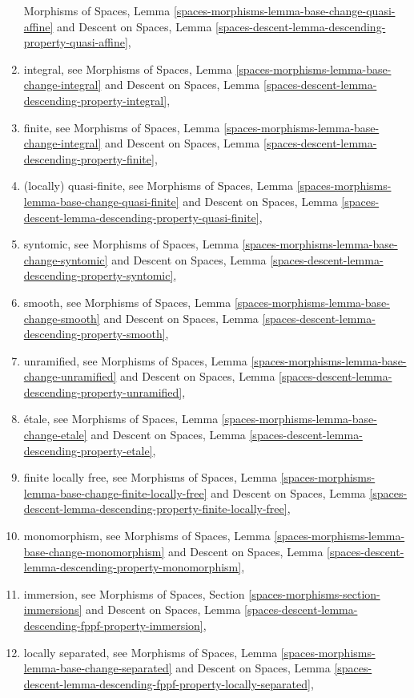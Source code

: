 \begin{enumerate}
Morphisms of Spaces,
Lemma \ref{spaces-morphisms-lemma-base-change-quasi-affine}
and
Descent on Spaces,
Lemma \ref{spaces-descent-lemma-descending-property-quasi-affine},
\item integral, see
Morphisms of Spaces,
Lemma \ref{spaces-morphisms-lemma-base-change-integral}
and
Descent on Spaces,
Lemma \ref{spaces-descent-lemma-descending-property-integral},
\item finite, see
Morphisms of Spaces,
Lemma \ref{spaces-morphisms-lemma-base-change-integral}
and
Descent on Spaces,
Lemma \ref{spaces-descent-lemma-descending-property-finite},
\item (locally) quasi-finite, see
Morphisms of Spaces,
Lemma \ref{spaces-morphisms-lemma-base-change-quasi-finite}
and
Descent on Spaces,
Lemma \ref{spaces-descent-lemma-descending-property-quasi-finite},
\item syntomic, see
Morphisms of Spaces,
Lemma \ref{spaces-morphisms-lemma-base-change-syntomic}
and
Descent on Spaces,
Lemma \ref{spaces-descent-lemma-descending-property-syntomic},
\item smooth, see
Morphisms of Spaces,
Lemma \ref{spaces-morphisms-lemma-base-change-smooth}
and
Descent on Spaces,
Lemma \ref{spaces-descent-lemma-descending-property-smooth},
\item unramified, see
Morphisms of Spaces,
Lemma \ref{spaces-morphisms-lemma-base-change-unramified}
and
Descent on Spaces,
Lemma \ref{spaces-descent-lemma-descending-property-unramified},
\item \'etale, see
Morphisms of Spaces,
Lemma \ref{spaces-morphisms-lemma-base-change-etale}
and
Descent on Spaces,
Lemma \ref{spaces-descent-lemma-descending-property-etale},
\item finite locally free, see
Morphisms of Spaces,
Lemma \ref{spaces-morphisms-lemma-base-change-finite-locally-free}
and
Descent on Spaces,
Lemma \ref{spaces-descent-lemma-descending-property-finite-locally-free},
\item monomorphism, see
Morphisms of Spaces,
Lemma \ref{spaces-morphisms-lemma-base-change-monomorphism}
and
Descent on Spaces,
Lemma \ref{spaces-descent-lemma-descending-property-monomorphism},
\item immersion, see
Morphisms of Spaces, Section \ref{spaces-morphisms-section-immersions}
and
Descent on Spaces,
Lemma \ref{spaces-descent-lemma-descending-fppf-property-immersion},
\item locally separated, see
Morphisms of Spaces,
Lemma \ref{spaces-morphisms-lemma-base-change-separated}
and
Descent on Spaces,
Lemma \ref{spaces-descent-lemma-descending-fppf-property-locally-separated},
\end{enumerate}

